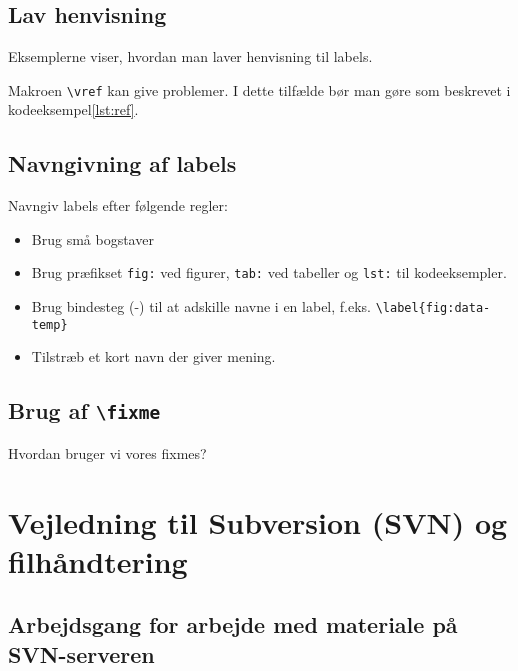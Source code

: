 \documentclass[simple,final]{../mypaper}
\begin{document}
\section{Lav henvisning}

Eksemplerne viser, hvordan man laver henvisning til labels.



Makroen \texttt{\textbackslash vref} kan give problemer. I dette tilfælde
bør man gøre som beskrevet i kodeeksempel\vref{lst:ref}.




\section{Navngivning af labels}

Navngiv labels efter følgende regler:

\begin{itemize}
\item Brug små bogstaver
\item Brug præfikset \texttt{fig:} ved figurer, \texttt{tab:} ved
  tabeller og \texttt{lst:} til kodeeksempler.
\item Brug bindesteg (-) til at adskille navne i en label,
  f.eks. \texttt{\textbackslash label\{fig:data-temp\}}
\item Tilstræb et kort navn der giver mening.
\end{itemize}


\section{Brug af \texttt{\textbackslash fixme}}

Hvordan bruger vi vores fixmes?


\chapter{Vejledning til Subversion (SVN) og filhåndtering}

\section{Arbejdsgang for arbejde med materiale på SVN-serveren}
\end{document}
